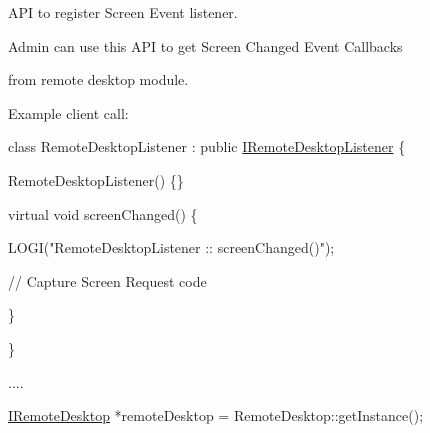 \-A\-P\-I to register \-Screen \-Event listener. 

\-Admin can use this \-A\-P\-I to get \-Screen \-Changed \-Event \-Callbacks

from remote desktop module.

\-Example client call\-:


\begin{DoxyPre}\end{DoxyPre}



\begin{DoxyPre}  class RemoteDesktopListener : public \hyperlink{classknoxremotedesktop_1_1IRemoteDesktopListener}{IRemoteDesktopListener} \{\end{DoxyPre}



\begin{DoxyPre}      RemoteDesktopListener() \{\}\end{DoxyPre}



\begin{DoxyPre}      virtual void screenChanged() \{\end{DoxyPre}



\begin{DoxyPre}	        LOGI("RemoteDesktopListener :: screenChanged()");\end{DoxyPre}



\begin{DoxyPre}          // Capture Screen Request code\end{DoxyPre}



\begin{DoxyPre}      \}\end{DoxyPre}



\begin{DoxyPre}  \}\end{DoxyPre}



\begin{DoxyPre}  ....\end{DoxyPre}



\begin{DoxyPre}  \hyperlink{classknoxremotedesktop_1_1IRemoteDesktop}{IRemoteDesktop} *remoteDesktop = RemoteDesktop::getInstance();\end{DoxyPre}




